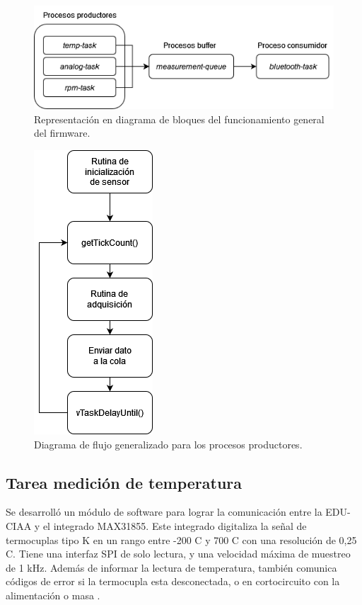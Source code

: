 \begin{figure}[htpb]
\centering
\includegraphics[width=1\textwidth]{./Figures/diagrama-firmware.png}
\caption{Representación en diagrama de bloques del funcionamiento general del firmware.}
\label{fig:diagrama-firmware}
\end{figure}

\begin{figure}[htpb]
\centering
\includegraphics[width=.25\textwidth]{./Figures/flujo-productor.png}
\caption{Diagrama de flujo generalizado para los procesos productores.}
\label{fig:flujo-productor}
\end{figure}

\break

\subsection{Tarea medición de temperatura}

Se desarrolló un módulo de software para lograr la comunicación entre la EDU-CIAA y el integrado MAX31855. Este integrado digitaliza la señal de termocuplas tipo K en un rango entre -200 \degree C y 700 \degree C con una resolución de 0,25 \degree C. Tiene una interfaz SPI de solo lectura, y una velocidad máxima de muestreo de 1 kHz. Además de informar la lectura de temperatura, también comunica códigos de error si la termocupla esta desconectada, o en cortocircuito con la alimentación o masa \cite{MAX31855}. 

